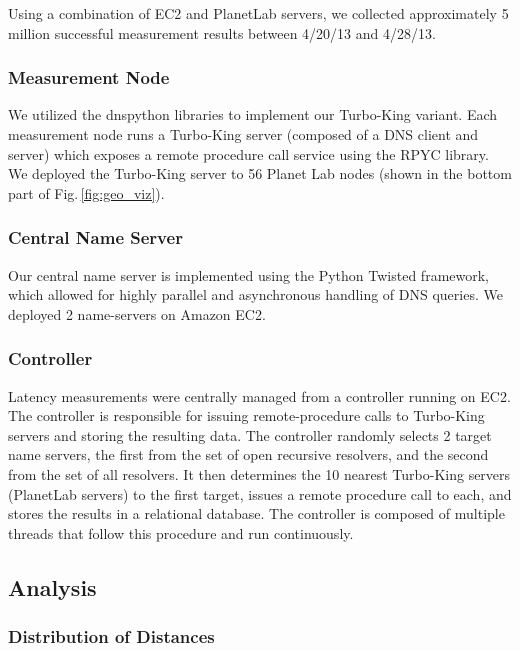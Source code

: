 Using a combination of EC2 and PlanetLab servers, we collected approximately 5 million successful measurement results between 4/20/13 and 4/28/13.

\subsubsection{Measurement Node}
We utilized the dnspython libraries to implement our Turbo-King variant. Each measurement node runs a Turbo-King server (composed of a DNS client and server) which exposes a remote procedure call service using the RPYC library. We deployed the Turbo-King server to 56 Planet Lab nodes (shown in the bottom part of Fig.\,\ref{fig:geo_viz}).

\subsubsection{Central Name Server}
Our central name server is implemented using the Python Twisted framework, which allowed for highly parallel and asynchronous handling of DNS queries. We deployed 2 name-servers on Amazon EC2.

\subsubsection{Controller}
Latency measurements were centrally managed from a controller running on EC2. The controller is responsible for issuing remote-procedure calls to Turbo-King servers and storing the resulting data. The controller randomly selects 2 target name servers, the first from the set of open recursive resolvers, and the second from the set of all resolvers. It then determines the 10 nearest Turbo-King servers (PlanetLab servers) to the first target, issues a remote procedure call to each, and stores the results in a relational database. The controller is composed of multiple threads that follow this procedure and run continuously.

\subsection{Analysis}
\label{sec:analysis}

\subsubsection{Distribution of Distances}


